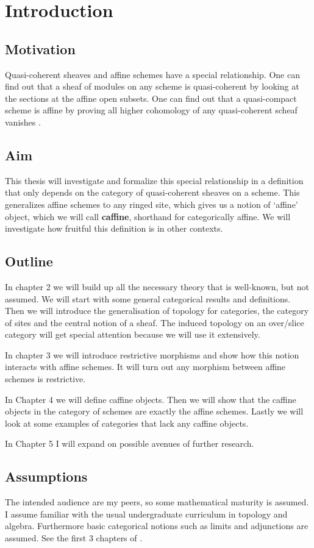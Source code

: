 \chapter{Introduction}

\section{Motivation}
Quasi-coherent sheaves and affine schemes have a special relationship. One can find out that a sheaf of modules on any scheme is quasi-coherent by looking at the sections at the affine open subsets.
One can find out that a quasi-compact scheme is affine by proving all higher cohomology of any quasi-coherent scheaf vanishes \cite[\href{http://stacks.math.columbia.edu/tag/01XF}{Tag 01XF}]{stacks}. 


\section{Aim}
This thesis will investigate 
and formalize this special relationship in 
a definition that only depends on the category of quasi-coherent sheaves on a scheme. 
This generalizes affine schemes to any ringed site, which gives us a notion of `affine' object, which we will call \textbf{caffine}, shorthand for categorically affine.
We will investigate how fruitful this definition is in other contexts.

\section{Outline}
In chapter 2 we will build up all the necessary theory that is well-known, but not assumed.
We will start with some general categorical results and definitions. Then we will introduce the generalisation of topology for categories, the category of sites and the central notion of a sheaf. The induced topology on an over/slice category will get special attention because we will use it extensively.

In chapter 3 we will introduce restrictive morphisms and show how this notion interacts with affine schemes.
It will turn out any morphism between affine schemes is restrictive.

In Chapter 4 we will define caffine objects.
Then we will show that the caffine objects in the category of schemes are exactly the affine schemes.
Lastly we will look at some examples of categories that lack any caffine objects.

In Chapter 5 I will expand on possible avenues of further research.

\section{Assumptions}
The intended audience are my peers, so some mathematical maturity is assumed.
I assume familiar with the usual undergraduate curriculum in topology and algebra. Furthermore basic categorical notions such as limits and adjunctions are assumed.
See the first 3 chapters of \cite{catsUU}.